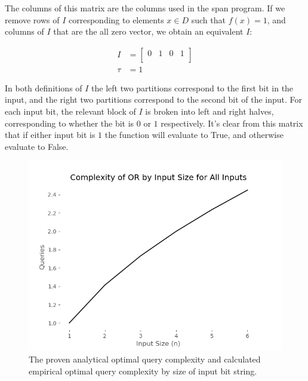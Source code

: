 The columns of this matrix are the columns used in the span program. If we remove rows of $I$ corresponding to elements $ x \in D$ such that $f(x) = 1$, and columns of $I$ that are the all zero vector, we obtain an equivalent $I$:

\begin{align}
I &= \left[\begin{array}{c|c|c|c}
   0 & 1 & 0 & 1 \\
\end{array} \right] \nonumber \\
\tau &= 1 \nonumber
\end{align}

In both definitions of $I$ the left two partitions correspond to the first bit in the
input, and the right two partitions correspond to the second bit of the input. For each
input bit, the relevant block of $I$ is broken into left and right halves, corresponding
to whether the bit is $0$ or $1$ respectively. It's clear from this matrix that if either input bit is $1$ the function will evaluate to True, and otherwise evaluate to False.

\begin{figure}[ht]
\centering
\includegraphics[scale=.5]{figures/or_all_complexity.png}
\caption{The proven analytical optimal query complexity
and calculated empirical optimal query complexity by 
size of input bit string.}
\label{fig:or_all_complexity}
\end{figure}

